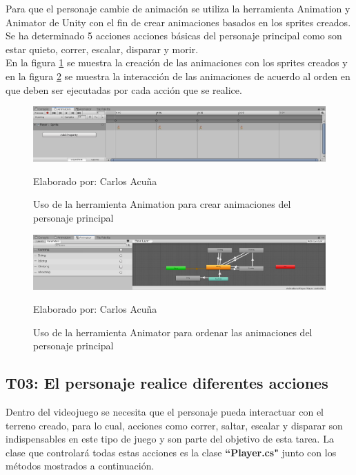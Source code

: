 \documentclass[a4paper, openright, 12pt]{report}
\begin{document}
\justify
Para que el personaje cambie de animación se utiliza la herramienta Animation y Animator de Unity con el fin de crear animaciones basados en los sprites creados.  Se ha determinado 5 acciones acciones básicas del personaje principal como son estar quieto, correr, escalar, disparar y morir.\\
En la figura \ref{fig:T02_01} se muestra la creación de las animaciones con los sprites creados y en la figura \ref{fig:T02_02} se muestra la interacción de las animaciones de acuerdo al orden en que deben ser ejecutadas por cada acción que se realice.
\clearpage
\begin{figure}[h]
\captionsetup{justification=centering,margin=2cm}
\includegraphics[scale=0.4]{T02_01}
\centering
\caption{Uso de la herramienta Animation para crear animaciones del personaje principal}
Elaborado por: Carlos Acuña
\label{fig:T02_01}
\end{figure}

\begin{figure}[h]
\captionsetup{justification=centering,margin=2cm}
\includegraphics[scale=0.4]{T02_02}
\centering
\caption{Uso de la herramienta Animator para ordenar las animaciones del personaje principal}
Elaborado por: Carlos Acuña
\label{fig:T02_02}
\end{figure}
\clearpage
\subsection*{T03: El personaje realice diferentes acciones}
\justify
Dentro del videojuego se necesita que el personaje pueda interactuar con el terreno creado, para lo cual, acciones como correr, saltar, escalar y disparar son indispensables en este tipo de juego y son parte del objetivo de esta tarea. La clase que controlará todas estas acciones es la clase \textbf{``Player.cs"} junto con los métodos mostrados a continuación.
\end{document}
